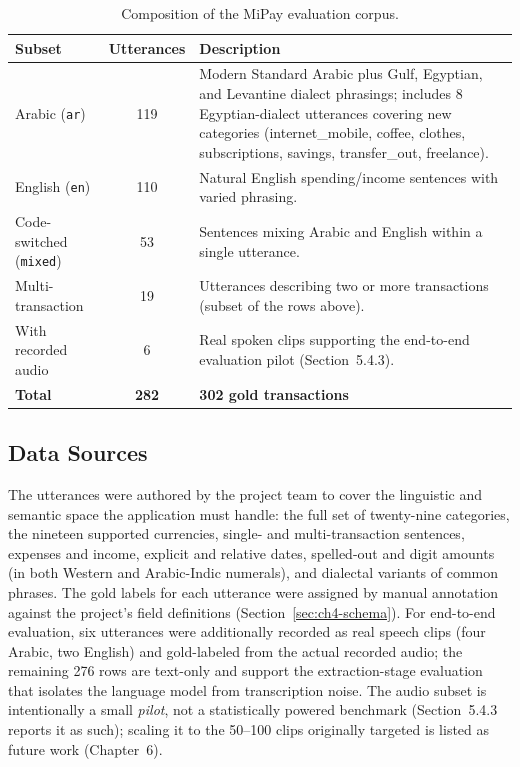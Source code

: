 \begin{table}[H]
\centering
\caption{Composition of the MiPay evaluation corpus.}
\label{tab:dataset}
\small
\renewcommand{\arraystretch}{1.25}
\begin{tabularx}{\textwidth}{l c X}
\toprule
\textbf{Subset} & \textbf{Utterances} & \textbf{Description} \\
\midrule
Arabic (\texttt{ar}) & 119 & Modern Standard Arabic plus Gulf, Egyptian, and Levantine dialect phrasings; includes 8 Egyptian-dialect utterances covering new categories (internet\_mobile, coffee, clothes, subscriptions, savings, transfer\_out, freelance). \\
English (\texttt{en}) & 110 & Natural English spending/income sentences with varied phrasing. \\
Code-switched (\texttt{mixed}) & 53 & Sentences mixing Arabic and English within a single utterance. \\
\midrule
Multi-transaction & 19 & Utterances describing two or more transactions (subset of the rows above). \\
With recorded audio & 6 & Real spoken clips supporting the end-to-end evaluation pilot (Section~5.4.3). \\
\midrule
\textbf{Total} & \textbf{282} & \textbf{302 gold transactions} \\
\bottomrule
\end{tabularx}
\end{table}

\subsection{Data Sources}

The utterances were authored by the project team to cover the linguistic and
semantic space the application must handle: the full set of twenty-nine categories,
the nineteen supported currencies, single- and multi-transaction sentences,
expenses and income, explicit and relative dates, spelled-out and digit amounts
(in both Western and Arabic-Indic numerals), and dialectal variants of common
phrases. The gold labels for each utterance were assigned by manual annotation
against the project's field definitions (Section~\ref{sec:ch4-schema}). For
end-to-end evaluation, six utterances were additionally recorded as real speech
clips (four Arabic, two English) and gold-labeled from the actual recorded
audio; the remaining 276 rows are text-only and support the extraction-stage
evaluation that isolates the language model from transcription noise. The audio
subset is intentionally a small \emph{pilot}, not a statistically powered
benchmark (Section~5.4.3 reports it as such); scaling it to the 50--100 clips
originally targeted is listed as future work (Chapter~6).

